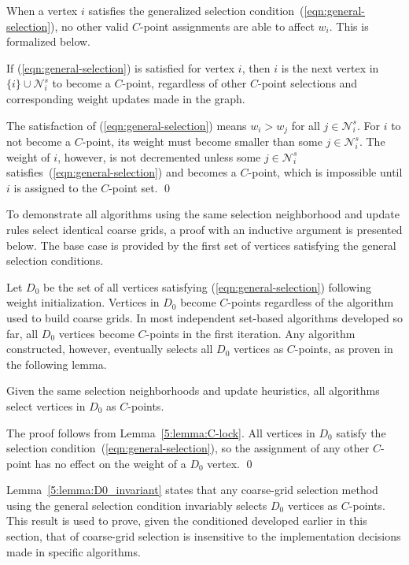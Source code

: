 \documentclass{elsart}
\newenvironment{proof}{\begin{pf}}{\qed\end{pf}}
\begin{document}
When a vertex $i$ satisfies the generalized selection
condition~(\ref{eqn:general-selection}), no other valid $C$-point
assignments are able to affect $w_i$. This is formalized below.
\begin{lem}
\label{5:lemma:C-lock}
If (\ref{eqn:general-selection}) is satisfied for vertex $i$, then $i$
is the next vertex in $\{i\} \cup \mathcal{N}_i^s$ to become a
$C$-point, regardless of other $C$-point selections and corresponding
weight updates made in the graph.
\end{lem}
\begin{proof}
The satisfaction of (\ref{eqn:general-selection}) means $w_i > w_j$
for all $j \in \mathcal{N}_i^s$. For $i$ to not become a $C$-point,
its weight must become smaller than some $j \in \mathcal{N}_i^s$. The
weight of $i$, however, is not decremented unless some $j \in
\mathcal{N}_i^s$ satisfies~(\ref{eqn:general-selection}) and becomes a
$C$-point, which is impossible until $i$ is assigned to the $C$-point
set.
\end{proof}

To demonstrate all algorithms using the same selection neighborhood
and update rules select identical coarse grids, a proof with an
inductive argument is presented below. The base case is provided by
the first set of vertices satisfying the general selection conditions.

Let $D_0$ be the set of all vertices satisfying
(\ref{eqn:general-selection}) following weight
initialization. Vertices in $D_0$ become $C$-points regardless of the
algorithm used to build coarse grids. In most independent set-based
algorithms developed so far, all $D_0$ vertices become $C$-points in
the first iteration. Any algorithm constructed, however, eventually
selects all $D_0$ vertices as $C$-points, as proven in the following
lemma.
\begin{lem}
\label{5:lemma:D0_invariant}
Given the same selection neighborhoods and update heuristics, all
algorithms select vertices in $D_0$ as $C$-points.
\end{lem}
\begin{proof}
The proof follows from Lemma~\ref{5:lemma:C-lock}. All vertices in
$D_0$ satisfy the selection condition~(\ref{eqn:general-selection}),
so the assignment of any other $C$-point has no effect on the weight
of a $D_0$ vertex.
\end{proof}

Lemma~\ref{5:lemma:D0_invariant} states that any coarse-grid selection
method using the general selection condition invariably selects $D_0$
vertices as $C$-points. This result is used to prove, given the
conditioned developed earlier in this section, that of
coarse-grid selection is insensitive to the implementation decisions
made in specific algorithms.
\end{document}
